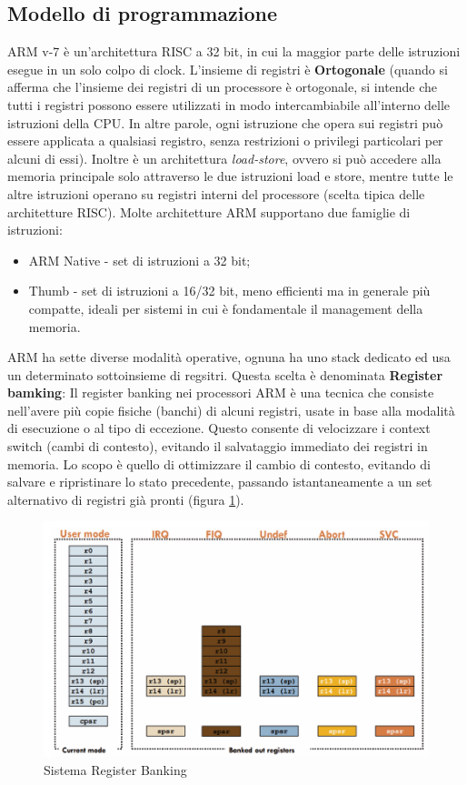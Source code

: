 \subsection{Modello di programmazione}
ARM v-7 è un'architettura RISC a 32 bit, in cui la maggior parte delle istruzioni esegue in un solo colpo di clock. L'insieme di registri è \textbf{Ortogonale} (quando si afferma che l'insieme dei registri di un processore è ortogonale, si intende che tutti i registri possono essere utilizzati in modo intercambiabile all'interno delle istruzioni della CPU. In altre parole, ogni istruzione che opera sui registri può essere applicata a qualsiasi registro, senza restrizioni o privilegi particolari per alcuni di essi). Inoltre è un architettura \textit{load-store}, ovvero si può accedere alla memoria principale solo attraverso le due istruzioni load e store, mentre tutte le altre istruzioni operano su registri interni del processore (scelta tipica delle architetture RISC). 
Molte architetture ARM supportano due famiglie di istruzioni:
\begin{itemize}
    \item ARM Native - set di istruzioni a 32 bit;
    \item Thumb - set di istruzioni a 16/32 bit, meno efficienti ma in generale più compatte, ideali per sistemi in cui è fondamentale il management della memoria. 
\end{itemize}

ARM ha sette diverse modalità operative, ognuna ha uno stack dedicato ed usa un determinato sottoinsieme di regsitri. Questa scelta è denominata \textbf{Register bamking}: Il register banking nei processori ARM è una tecnica che consiste nell'avere più copie fisiche (banchi) di alcuni registri, usate in base alla modalità di esecuzione o al tipo di eccezione. Questo consente di velocizzare i context switch (cambi di contesto), evitando il salvataggio immediato dei registri in memoria. Lo scopo è quello di ottimizzare il cambio di contesto, evitando di salvare e ripristinare lo stato precedente, passando istantaneamente a un set alternativo di registri già pronti (figura \ref{img:register_banking}).

\begin{figure}[h!]
    \centering
    \includegraphics[width=.7\textwidth]{img/register_banking.png}
    \caption{Sistema Register Banking}
    \label{img:register_banking}

\end{figure}

